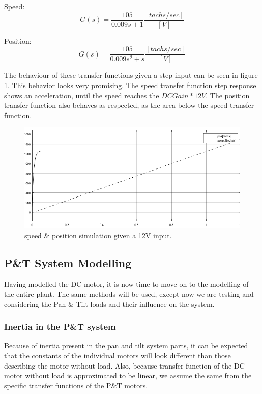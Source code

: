 Speed:
\begin{equation}
G(s)=\frac{105}{0.009s+1} \frac{[tachs/sec]}{[V]}
\end{equation}

Position:
\begin{equation}
G(s)=\frac{105}{0.009s^2+s} \frac{[tachs/sec]}{[V]}
\end{equation}

The behaviour of these transfer functions given a step input can be seen in figure \ref{fig:SpeedPosSim12V}. This behavior looks very promising. The speed transfer function step response shows an acceleration, until the speed reaches the $DC Gain * 12V$. The position transfer function also behaves as respected, as the area below the speed transfer function. 

\begin{figure}[h!]
\centering
\includegraphics[scale=0.6]{Billeder/SpeedPosSim12V.png}
\caption{speed \& position simulation given a 12V input.}
\label{fig:SpeedPosSim12V}
\end{figure}

\subsection{P\&T System Modelling}
Having modelled the DC motor, it is now time to move on to the modelling of the entire plant. The same methods will be used, except now we are testing and considering the Pan \& Tilt loads and their influence on the system.

\subsubsection{Inertia in the P\&T system}
Because of inertia present in the pan and tilt system parts, it can be expected that the constants of the individual motors will look different than those describing the motor without load. Also, because transfer function of the DC motor without load is approximated to be linear, we assume the same from the specific transfer functions of the P\&T motors.

